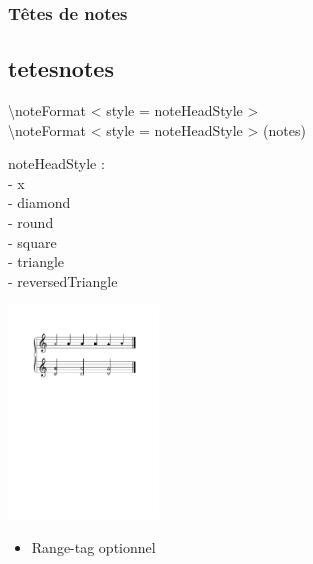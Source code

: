 \documentclass[12pt]{beamer}
\newenvironment{code}
  {\fontfamily{prc}\selectfont}{}
\begin{document}
    \begin{frame}
    \frametitle{Têtes de notes}
    \subsection{tetesnotes}
    
    \begin{code} \textbackslash{}noteFormat \textless{} style = noteHeadStyle \textgreater{}\\ 
    \textbackslash{}noteFormat \textless{} style = noteHeadStyle \textgreater{} (notes)\\ 
    \end{code}
    
    \begin{multicols}{2}

    \begin{code}
    noteHeadStyle :\\
      - x\\
      - diamond\\
      - round \\
      - square\\
      - triangle\\
      - reversedTriangle
    \end{code}
    
    \columnbreak

    \includegraphics[width=4cm]{img/partitions/noteheads.pdf}
    
   \end{multicols}

    \begin{itemize}
      \item Range-tag optionnel
    \end{itemize}
   
    
    \end{frame}
\end{document}
